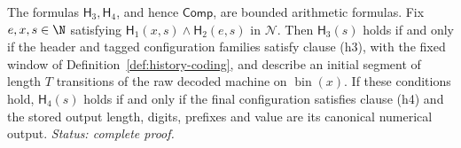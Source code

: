 \begin{lemma}
\label{lem:p04-configuration-output-formulas}
The formulas \(\mathsf H_3,\mathsf H_4\), and hence
\(\mathsf{Comp}\), are bounded arithmetic formulas.
Fix \(e,x,s\in\N\) satisfying \(\mathsf H_1(x,s)\land\mathsf H_2(e,s)\)
in \(\mathcal N\).  Then \(\mathsf H_3(s)\) holds if and only if the
header and tagged configuration families satisfy clause (h3), with
the fixed window of Definition~\ref{def:history-coding}, and describe
an initial segment of length \(T\) transitions of the raw decoded
machine on \(\operatorname{bin}(x)\).
If these conditions hold, \(\mathsf H_4(s)\) holds if and only if
the final configuration satisfies clause (h4) and the stored output
length, digits, prefixes and value are its canonical numerical output.
\textit{Status: complete proof.}
\end{lemma}

